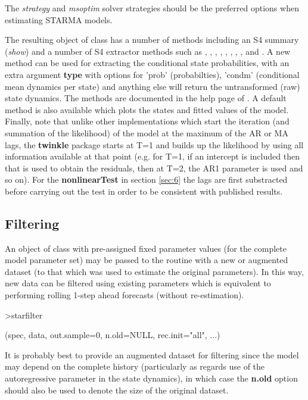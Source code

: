 The \emph{strategy} and \emph{msoptim} solver strategies should be the preferred
options when estimating STARMA models.

The resulting object of class  has a number of methods including
an S4 summary (\emph{show}) and a number of S4 extractor methods such as
, , , ,
, , , , 
and .
A new method  can be used for extracting the conditional state
probabilities, with an extra argument \textbf{type} with options for 'prob' 
(probabilties), 'condm' (conditional mean dynamics per state) and anything else 
will return the untransformed (raw) state dynamics. The methods are documented
in the help page of . A default  method is also
available which plots the states and fitted values of the model.
Finally, note that unlike other implementations which start the iteration (and
summation of the likelihood) of the model at the maximum of the AR or MA lags,
the \textbf{twinkle} package starts at T=1 and builds up the likelihood by
using all information available at that point (e.g. for T=1, if an intercept is
included then that is used to obtain the residuals, then at T=2, the AR1
parameter is used and so on). For the \textbf{nonlinearTest} in section
\ref{sec:6} the lags are first substracted before carrying out the test in 
order to be consistent with published results.

\subsection{Filtering}
An object of class  with pre-assigned fixed parameter values
(for the complete model parameter set) may be passed to the 
routine with a new or augmented dataset (to that which was used to estimate the
original parameters). In this way, new data can be filtered using existing
parameters which is equivalent to performing rolling 1-step ahead forecasts
(without re-estimation).
\begin{Schunk}
\begin{Sinput}
>starfilter
\end{Sinput}
\begin{Soutput}
(spec, data, out.sample=0, n.old=NULL, rec.init="all", ...) 
\end{Soutput}
\end{Schunk}
It is probably best to provide an augmented dataset for filtering since the
model may depend on the complete history (particularly as regards use of the
autoregressive parameter in the state dynamics), in which case the
\textbf{n.old} option should also be used to denote the size of the original
dataset.

